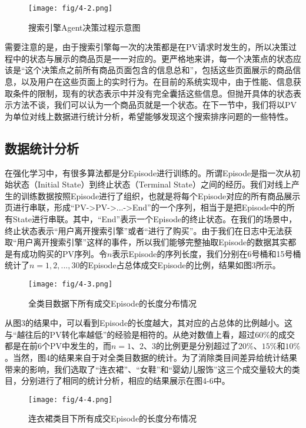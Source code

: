 \begin{figure}[!h]
\centering
\texttt{[image: fig/4-2.png]}
\caption{搜索引擎Agent决策过程示意图}
\end{figure}


需要注意的是，由于搜索引擎每一次的决策都是在PV请求时发生的，所以决策过程中的状态与展示的商品页是一一对应的。更严格地来讲，每一个决策点的状态应该是“这个决策点之前所有商品页面包含的信息总和”，包括这些页面展示的商品信息，以及用户在这些页面上的实时行为。在目前的系统实现中，由于性能、信息获取条件的限制，现有的状态表示中并没有完全囊括这些信息。但抛开具体的状态表示方法不谈，我们可以认为一个商品页就是一个状态。在下一节中，我们将以PV为单位对线上数据进行统计分析，希望能够发现这个搜索排序问题的一些特性。

\subsection{数据统计分析}
在强化学习中，有很多算法都是分Episode进行训练的。所谓Episode是指一次从初始状态（Initial State）到终止状态（Terminal State）之间的经历。我们对线上产生的训练数据按照Episode进行了组织，也就是将每个Episode对应的所有商品展示页进行串联，形成“PV->PV->...->End”的一个序列，相当于是把Episode中的所有State进行串联。其中，“End”表示一个Episode的终止状态。在我们的场景中，终止状态表示“用户离开搜索引擎”或者“进行了购买”。由于我们在日志中无法获取“用户离开搜索引擎”这样的事件，所以我们能够完整抽取Episode的数据其实都是有成功购买的PV序列。令$n$表示Episode的序列长度，我们分别在6号桶和15号桶统计了$n=1,2,...,30$的Episode占总体成交Episode的比例，结果如图3所示。

\begin{figure}[!h]
\centering
\texttt{[image: fig/4-3.png]}
\caption{全类目数据下所有成交Episode的长度分布情况}
\end{figure}

从图3的结果中，可以看到Episode的长度越大，其对应的占总体的比例越小。这与“越往后的PV转化率越低”的经验是相符的。从绝对数值上看，超过$60\%$的成交都是在前$6$个PV中发生的，而$n=1$、$2$、$3$的比例更是分别超过了$20\%$、$15\%$和$10\%$。当然，图4的结果来自于对全类目数据的统计。为了消除类目间差异给统计结果带来的影响，我们选取了“连衣裙”、“女鞋”和“婴幼儿服饰”这三个成交量较大的类目，分别进行了相同的统计分析，相应的结果展示在图4-6中。

\begin{figure}[!h]
\centering
\texttt{[image: fig/4-4.png]}
\caption{连衣裙类目下所有成交Episode的长度分布情况}
\end{figure}


